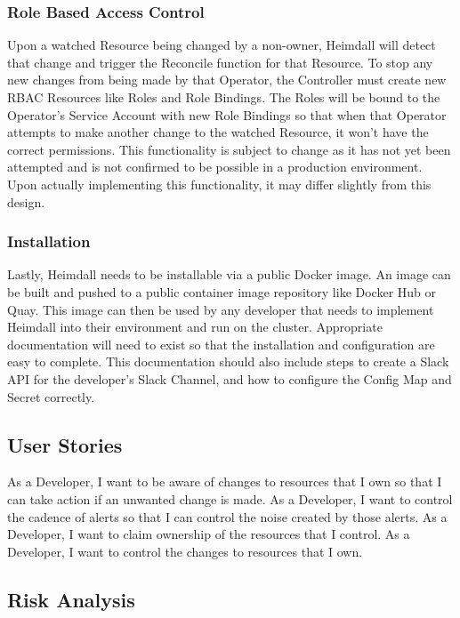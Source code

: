 \documentclass{article}
\begin{document}
\subsubsection{Role Based Access Control} \label{security}

Upon a watched Resource being changed by a non-owner, Heimdall will detect that change and trigger the Reconcile function for that Resource. To stop any new changes from being made by that Operator, the Controller must create new RBAC Resources like Roles and Role Bindings. The Roles will be bound to the Operator's Service Account with new Role Bindings so that when that Operator attempts to make another change to the watched Resource, it won't have the correct permissions. This functionality is subject to change as it has not yet been attempted and is not confirmed to be possible in a production environment. Upon actually implementing this functionality, it may differ slightly from this design.


\subsubsection{Installation}

Lastly, Heimdall needs to be installable via a public Docker image. An image can be built and pushed to a public container image repository like Docker Hub or Quay. This image can then be used by any developer that needs to implement Heimdall into their environment and run on the cluster. Appropriate documentation will need to exist so that the installation and configuration are easy to complete. This documentation should also include steps to create a Slack API for the developer's Slack Channel, and how to configure the Config Map and Secret correctly.



\subsection{User Stories}
As a Developer, I want to be aware of changes to resources that I own so that I can take action if an unwanted change is made.
As a Developer, I want to control the cadence of alerts so that I can control the noise created by those alerts.
As a Developer, I want to claim ownership of the resources that I control.
As a Developer, I want to control the changes to resources that I own.

\subsection{Risk Analysis}
\end{document}
